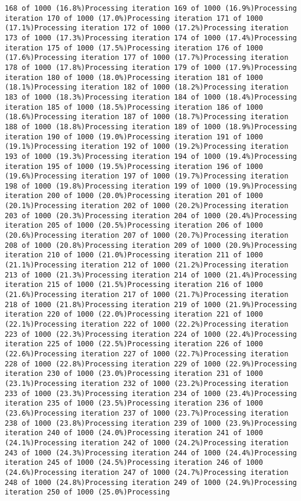 \documentclass[
]{article}
\begin{document}
\begin{verbatim}
168 of 1000 (16.8%)Processing iteration 169 of 1000 (16.9%)Processing iteration 170 of 1000 (17.0%)Processing iteration 171 of 1000 (17.1%)Processing iteration 172 of 1000 (17.2%)Processing iteration 173 of 1000 (17.3%)Processing iteration 174 of 1000 (17.4%)Processing iteration 175 of 1000 (17.5%)Processing iteration 176 of 1000 (17.6%)Processing iteration 177 of 1000 (17.7%)Processing iteration 178 of 1000 (17.8%)Processing iteration 179 of 1000 (17.9%)Processing iteration 180 of 1000 (18.0%)Processing iteration 181 of 1000 (18.1%)Processing iteration 182 of 1000 (18.2%)Processing iteration 183 of 1000 (18.3%)Processing iteration 184 of 1000 (18.4%)Processing iteration 185 of 1000 (18.5%)Processing iteration 186 of 1000 (18.6%)Processing iteration 187 of 1000 (18.7%)Processing iteration 188 of 1000 (18.8%)Processing iteration 189 of 1000 (18.9%)Processing iteration 190 of 1000 (19.0%)Processing iteration 191 of 1000 (19.1%)Processing iteration 192 of 1000 (19.2%)Processing iteration 193 of 1000 (19.3%)Processing iteration 194 of 1000 (19.4%)Processing iteration 195 of 1000 (19.5%)Processing iteration 196 of 1000 (19.6%)Processing iteration 197 of 1000 (19.7%)Processing iteration 198 of 1000 (19.8%)Processing iteration 199 of 1000 (19.9%)Processing iteration 200 of 1000 (20.0%)Processing iteration 201 of 1000 (20.1%)Processing iteration 202 of 1000 (20.2%)Processing iteration 203 of 1000 (20.3%)Processing iteration 204 of 1000 (20.4%)Processing iteration 205 of 1000 (20.5%)Processing iteration 206 of 1000 (20.6%)Processing iteration 207 of 1000 (20.7%)Processing iteration 208 of 1000 (20.8%)Processing iteration 209 of 1000 (20.9%)Processing iteration 210 of 1000 (21.0%)Processing iteration 211 of 1000 (21.1%)Processing iteration 212 of 1000 (21.2%)Processing iteration 213 of 1000 (21.3%)Processing iteration 214 of 1000 (21.4%)Processing iteration 215 of 1000 (21.5%)Processing iteration 216 of 1000 (21.6%)Processing iteration 217 of 1000 (21.7%)Processing iteration 218 of 1000 (21.8%)Processing iteration 219 of 1000 (21.9%)Processing iteration 220 of 1000 (22.0%)Processing iteration 221 of 1000 (22.1%)Processing iteration 222 of 1000 (22.2%)Processing iteration 223 of 1000 (22.3%)Processing iteration 224 of 1000 (22.4%)Processing iteration 225 of 1000 (22.5%)Processing iteration 226 of 1000 (22.6%)Processing iteration 227 of 1000 (22.7%)Processing iteration 228 of 1000 (22.8%)Processing iteration 229 of 1000 (22.9%)Processing iteration 230 of 1000 (23.0%)Processing iteration 231 of 1000 (23.1%)Processing iteration 232 of 1000 (23.2%)Processing iteration 233 of 1000 (23.3%)Processing iteration 234 of 1000 (23.4%)Processing iteration 235 of 1000 (23.5%)Processing iteration 236 of 1000 (23.6%)Processing iteration 237 of 1000 (23.7%)Processing iteration 238 of 1000 (23.8%)Processing iteration 239 of 1000 (23.9%)Processing iteration 240 of 1000 (24.0%)Processing iteration 241 of 1000 (24.1%)Processing iteration 242 of 1000 (24.2%)Processing iteration 243 of 1000 (24.3%)Processing iteration 244 of 1000 (24.4%)Processing iteration 245 of 1000 (24.5%)Processing iteration 246 of 1000 (24.6%)Processing iteration 247 of 1000 (24.7%)Processing iteration 248 of 1000 (24.8%)Processing iteration 249 of 1000 (24.9%)Processing iteration 250 of 1000 (25.0%)Processing 
\end{verbatim}
\end{document}
